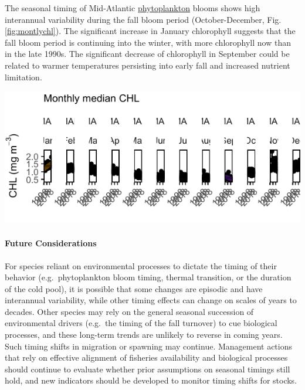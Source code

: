 \documentclass[
  10pt,
]{article}
\let\origfigure\figure
\let\endorigfigure\endfigure
\renewenvironment{figure}[1][2] {
    \expandafter\origfigure\expandafter[H]
} {
    \endorigfigure
}
\begin{document}
The seasonal timing of Mid-Atlantic \href{https://noaa-edab.github.io/catalog/chl_pp.html}{phytoplankton} blooms shows high interannual variability during the fall bloom period (October-December, Fig. \ref{fig:montlychl}). The significant increase in January chlorophyll suggests that the fall bloom period is continuing into the winter, with more chlorophyll now than in the late 1990s. The significant decrease of chlorophyll in September could be related to warmer temperatures persisting into early fall and increased nutrient limitation.

\begin{figure}

{\centering \includegraphics{midatlantic_files/figure-latex/montlychl-1} 

}

\caption{Monthly median chlorophyll a concentration in the MAB (black) with significant increase in January (orange line) and decrease in September (purple line).}\label{fig:montlychl}
\end{figure}

\paragraph{Future Considerations}\label{future-considerations-1}

For species reliant on environmental processes to dictate the timing of their behavior (e.g.~phytoplankton bloom timing, thermal transition, or the duration of the cold pool), it is possible that some changes are episodic and have interannual variability, while other timing effects can change on scales of years to decades. Other species may rely on the general seasonal succession of environmental drivers (e.g.~the timing of the fall turnover) to cue biological processes, and these long-term trends are unlikely to reverse in coming years. Such timing shifts in migration or spawning may continue. Management actions that rely on effective alignment of fisheries availability and biological processes should continue to evaluate whether prior assumptions on seasonal timings still hold, and new indicators should be developed to monitor timing shifts for stocks.
\end{document}
